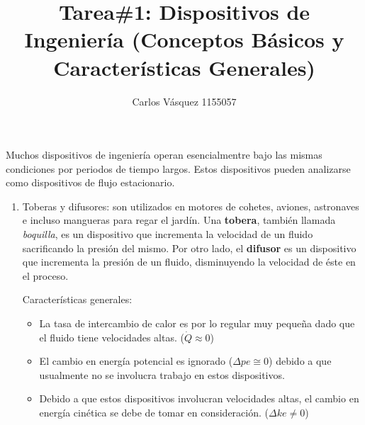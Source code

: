 \documentclass[12pt, letterpaper]{article}
\title{Tarea\#1: Dispositivos de Ingeniería\autocite{cengel} (Conceptos Básicos y Características Generales)}
\author{Carlos Vásquez 1155057}
\begin{document}
\maketitle

Muchos dispositivos de ingeniería operan esencialmentre bajo las mismas condiciones por periodos de tiempo largos. Estos dispositivos pueden analizarse como dispositivos de flujo estacionario.

\begin{enumerate}	
	\item Toberas y difusores: son utilizados en motores de cohetes, aviones, astronaves e incluso mangueras para regar el jardín. Una \textbf{tobera}, también llamada \textit{boquilla}, es un dispositivo que incrementa la velocidad de un fluido sacrificando la presión del mismo. Por otro lado, el \textbf{difusor} es un dispositivo que incrementa la presión de un fluido, disminuyendo la velocidad de éste en el proceso.

	Características generales:
	\begin{itemize}
		\item La tasa de intercambio de calor es por lo regular muy pequeña dado que el fluido tiene velocidades altas. ($\dot{Q} \approx 0$)
		\item El cambio en energía potencial es ignorado ($\Delta pe \cong 0$) debido a que usualmente no se involucra trabajo en estos dispositivos.
		\item Debido a que estos dispositivos involucran velocidades altas, el cambio en energía cinética se debe de tomar en consideración. ($\Delta ke \neq 0$)
	\end{itemize}


\end{enumerate}
\end{document}
